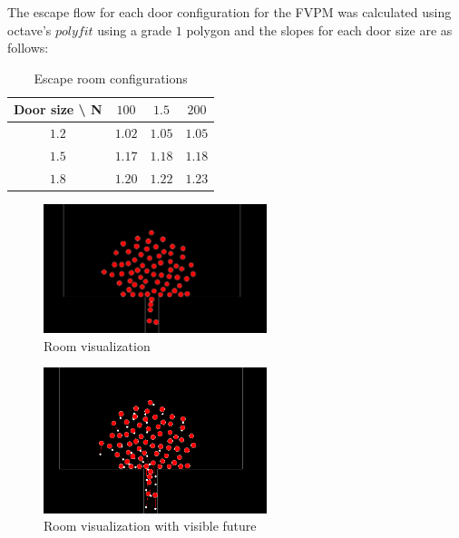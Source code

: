 \documentclass[english]{article}
\providecommand{\tabularnewline}{\\}
\begin{document}
    
    The escape flow for each door configuration for the FVPM was calculated using octave's 
    $polyfit$ using a grade $1$ polygon and the slopes for each door size are as follows:

    \begin{table}[H]
        \begin{centering}
        \begin{tabular}{|c|c|c|c|}
        \hline 
        Door size \textbackslash{} N & $100$ & $1.5$ & $200$\tabularnewline
        \hline 
        \hline 
        $1.2$ & $1.02$ & $1.05$ & $1.05$\tabularnewline
        \hline 
        $1.5$ & $1.17$ & $1.18$ & $1.18$\tabularnewline
        \hline 
        $1.8$ & $1.20$ & $1.22$ & $1.23$\tabularnewline
        \hline 
        \end{tabular}
        \caption{Escape room configurations \label{tbl:room-runs}}
        \end{centering}
    \end{table}

    \begin{figure}[H]
        \begin{centering}
        \includegraphics[width=6.5cm]{pics/program/room-no-future} 
        \par\end{centering}
        
        \caption{\label{fig:room-no-future} Room visualization}
    \end{figure}
    
    \begin{figure}[H]
        \centering{} \includegraphics[width=6.5cm]{pics/program/room-future}
        \caption{\label{fig:room-future} Room visualization with visible future}
    \end{figure}
    
\end{document}
